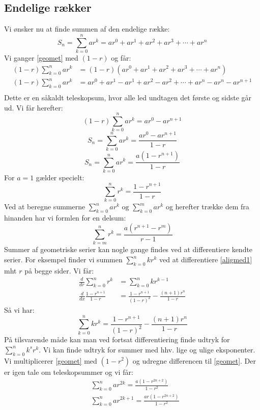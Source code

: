 \subsection{Endelige rækker}
Vi ønsker nu at finde summen af den endelige række:
\begin{equation}
S_{n}=\sum_{k=0}^{n}ar^{k}=ar^{0}+ar^{1}+ar^{2}+ar^{3}+\dotsm +ar^{n}\label{geomet}
\end{equation}
Vi ganger \ref{geomet} med \((1-r)\) og får:
\begin{align*}
(1-r)\sum_{k=0}^{n}ar^{k}&=(1-r)(ar^{0}+ar^{1}+ar^{2}+ar^{3}+\dotsm +ar^{n})\\
(1-r)\sum_{k=0}^{n}ar^{k}&=ar^{0}+ar^{1}-ar^{1}+ar^{2}-ar^{2}+\dotsm +ar^{n}-ar^{n}-ar^{n+1}\\
\end{align*}
Dette er en såkaldt teleskopsum, hvor alle led undtagen det første og sidste går ud. Vi får herefter:
\[(1-r)\sum_{k=0}^{n}ar^{k}=ar^{0}-ar^{n+1}\]
\[S_{n}=\sum_{k=0}^{n}ar^{k}=\frac{ar^{0}-ar^{n+1}}{1-r}\]
\begin{equation}
S_{n}=\sum_{k=0}^{n}ar^{k}=\frac{a(1-r^{n+1})}{1-r}\label{geometbase}
\end{equation}
For \(a=1\) gælder specielt:
\begin{equation}
\sum_{k=0}^{n}r^{k}=\frac{1-r^{n+1}}{1-r}\label{aligmed1}
\end{equation}
Ved at beregne summerne \(\sum_{k=0}^{n}ar^{k} \text{ og } \sum_{k=0}^{m}ar^{k}\) og herefter trække dem fra hinanden har vi formlen for en delsum:
\begin{equation}
\sum_{k=m}^{n}r^{k}=\frac{a(r^{n+1}-r^{m})}{r-1}\label{geometdelsum}
\end{equation}
Summer af geometriske serier kan nogle gange findes ved at differentiere kendte serier.
For eksempel finder vi summen \(\sum_{k=0}^{n}kr^{k}\) ved at differentiere \ref{aligmed1} mht \(r\) på begge sider. Vi får:
\begin{align*}
\frac{d}{dr}\sum_{k=0}^{n}r^{k}&=\sum_{k=0}^{n}kr^{k-1}\\
\frac{d}{dx}\frac{1-r^{n+1}}{1-r}&=\frac{1-r^{n+1}}{(1-r)^{2}}-\frac{(n+1)r^{n}}{1-r}
\end{align*}
Så vi har:
\begin{equation}
\sum_{k=0}^{n}kr^{k}=\frac{1-r^{n+1}}{(1-r)^{2}}-\frac{(n+1)r^{n}}{1-r}
\end{equation}
På tilsvarende måde kan man ved fortsat differentiering finde udtryk for \(\sum_{k=0}^{n}k^{s}r^{k}\). Vi kan finde udtryk for summer med hhv. lige og ulige eksponenter. Vi multiplicerer \ref{geomet} med \((1-r^{2})\) og udregne differencen til \ref{geomet}. Der er igen tale om teleskopsummer og vi får:
\begin{align}
&\sum_{k=0}^{n}ar^{2k}=\frac{a(1-r^{2n+2})}{1-r^{2}}\label{geometlige}\\
&\sum_{k=0}^{n}ar^{2k+1}=\frac{ar(1-r^{2n+2})}{1-r^{2}}\label{geometulige}
\end{align}
